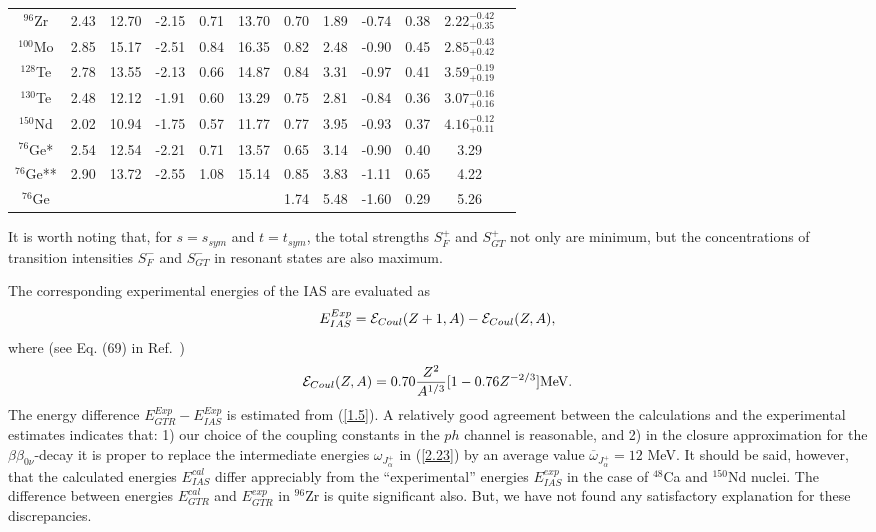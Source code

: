 \documentclass[nofootinbib,twocolumn,eqsecnum,floats,aps]{revtex4}
\def\be{\begin{equation}}
\def\ee{\end{equation}}
\def\rf#1{{(\ref{#1})}}
\def\E {{{\cal E}}}
\def\a {{\alpha}}
\begin{document}
{\begin{table*}[t]
\begin{center}
\begin{tabular}{c|ccccc|cccccc}
 $^{96}$Zr  & 2.43& 12.70& -2.15&  0.71&   13.70& 0.70& 1.89& -0.74& 0.38& $2.22^{-0.42}_{+0.35}$\\
 $^{100}$Mo & 2.85& 15.17& -2.51&  0.84&   16.35& 0.82& 2.48& -0.90& 0.45& $2.85^{-0.43}_{+0.42}$\\
{$^{128}$Te}& 2.78& 13.55& -2.13&  0.66&   14.87& 0.84& 3.31& -0.97& 0.41& $3.59^{-0.19}_{+0.19}$\\
{$^{130}$Te}& 2.48& 12.12& -1.91&  0.60&   13.29& 0.75& 2.81& -0.84& 0.36& $3.07^{-0.16}_{+0.16}$\\
{$^{150}$Nd}& 2.02& 10.94& -1.75&  0.57&   11.77& 0.77& 3.95& -0.93& 0.37& $4.16^{-0.12}_{+0.11}$\\
\hline
$^{76}$Ge*  & 2.54& 12.54& -2.21&  0.71& 13.57  &  0.65&  3.14& -0.90&    0.40&    3.29\\
$^{76}$Ge** & 2.90& 13.72& -2.55&  1.08& 15.14  &  0.85&  3.83& -1.11&    0.65&    4.22\\
$^{76}$Ge \cite{Hyv15}& &&&& &                   1.74  &  5.48& -1.60&    0.29&    5.26 \\
\hline
\end{tabular}
\end{center}\end{table*}

\bigskip

It is worth noting that, for
 $s=s_{sym}$ and
$t=t_{sym}$, the total strengths $S^+_F$ and $S^+_{GT}$ not only are
minimum,  but  the concentrations of  transition intensities
$S^-_F$ and $S^-_{GT}$  in  resonant states are also maximum.

The corresponding experimental energies of the IAS are
evaluated as
\be E_{IAS}^{Exp}=\E_{Coul}(Z+1,A)-\E_{Coul}(Z,A),
\label{4.3}\ee
where (see Eq. (69) in Ref.~\cite{Boh69})
\be
\E_{Coul}(Z,A)=0.70\frac{Z^2}{A^{1/3}}[1-0.76Z^{-2/3}] {\rm MeV}.
\label{4.4}\ee
The energy difference $E_{GTR}^{Exp}-E_{IAS}^{Exp}$
is estimated from \rf{1.5}.  A relatively good agreement
between  the calculations and the experimental estimates indicates that: 1)
our choice of the coupling constants in the $ph$ channel is reasonable,
and 2) in the closure  approximation for the $\beta\beta_{0\nu}$-decay
it is proper to replace the intermediate energies
${\omega_{J_\a^+}}$ in \rf{2.23} by an average value
${\overline\omega_{J_\a^+}}=12$ MeV. It should be said, however, that
the calculated energies $E_{IAS}^{cal }$ differ
appreciably from the ``experimental'' energies $E_{IAS}^{e xp}$
in the case of $^{48}$Ca and $^{150}$Nd nuclei.
The difference between energies $E_{GTR}^{cal}$ and $E_{GTR}^{exp}$   in {$^{96}$Zr}
is quite significant also.
But, we have not found any satisfactory explanation for  these discrepancies.

}
\end{document}
